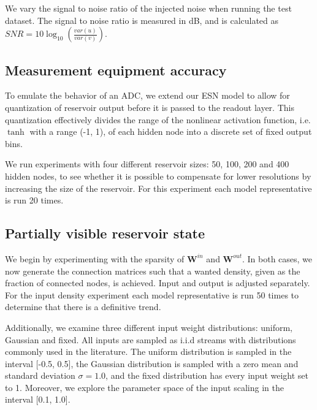 We vary the signal to noise ratio of the injected noise when running the test
dataset. The signal to noise ratio is measured in dB, and is calculated as $SNR
= 10\log_{10}(\frac{var(u)}{var(v)})$.

\subsection{Measurement equipment accuracy}

To emulate the behavior of an ADC, we extend our ESN model to allow for
quantization of reservoir output before it is passed to the readout layer. This
quantization effectively divides the range of the nonlinear activation function,
i.e. $\tanh$ with a range (-1, 1), of each hidden node into a discrete set of
fixed output bins.

We run experiments with four different reservoir sizes: 50, 100, 200 and 400
hidden nodes, to see whether it is possible to compensate for lower resolutions
by increasing the size of the reservoir. For this experiment each model
representative is run 20 times.

\subsection{Partially visible reservoir state}

We begin by experimenting with the sparsity of $\mathbf{W}^{in}$ and
$\mathbf{W}^{out}$. In both cases, we now generate the connection matrices such
that a wanted density, given as the fraction of connected nodes, is
achieved. Input and output is adjusted separately. For the input density
experiment each model representative is run 50 times to determine that there is
a definitive trend.

Additionally, we examine three different input weight distributions: uniform,
Gaussian and fixed. All inputs are sampled as i.i.d streams with distributions
commonly used in the literature. The uniform distribution is sampled in the
interval [-0.5, 0.5], the Gaussian distribution is sampled with a zero mean and
standard deviation $\sigma = 1.0$, and the fixed distribution has every input
weight set to 1. Moreover, we explore the parameter space of the input scaling
in the interval [0.1, 1.0].

